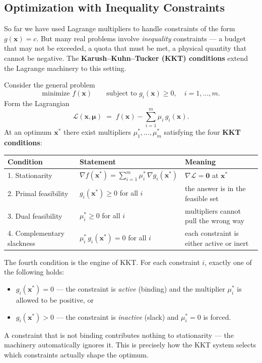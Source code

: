 \subsection*{Optimization with Inequality Constraints} 

\noindent So far we have used Lagrange multipliers to handle constraints of the form $g(\mathbf{x}) = c$. But many real problems involve \textit{inequality} constraints --- a budget that may not be exceeded, a quota that must be met, a physical quantity that cannot be negative. The \textbf{Karush--Kuhn--Tucker (KKT) conditions}  extend the Lagrange machinery to this setting.

\noindent Consider the general problem
\[
\text{minimize } f(\mathbf{x}) \qquad \text{subject to } g_i(\mathbf{x}) \geq 0, \quad i = 1, \ldots, m.
\]
Form the Lagrangian
\[
\mathcal{L}(\mathbf{x}, \boldsymbol{\mu}) \;=\; f(\mathbf{x}) - \sum_{i=1}^{m} \mu_i \, g_i(\mathbf{x}).
\]
At an optimum $\mathbf{x}^*$ there exist multipliers $\mu_1^*, \ldots, \mu_m^*$ satisfying the four \textbf{KKT conditions}:

\begin{center}
\renewcommand{\arraystretch}{1.5}
\begin{tabular}{@{}p{}p{}p{}@{}}
\toprule
\textbf{Condition} & \textbf{Statement} & \textbf{Meaning} \\
\midrule
1. Stationarity & $\nabla f(\mathbf{x}^*) = \displaystyle\sum_{i=1}^{m} \mu_i^* \, \nabla g_i(\mathbf{x}^*)$ & $\nabla \mathcal{L} = \mathbf{0}$ at $\mathbf{x}^*$ \\
2. Primal feasibility & $g_i(\mathbf{x}^*) \geq 0$ for all $i$ & the answer is in the feasible set \\
3. Dual feasibility & $\mu_i^* \geq 0$ for all $i$ & multipliers cannot pull the wrong way \\
4. Complementary slackness & $\mu_i^* \, g_i(\mathbf{x}^*) = 0$ for all $i$ & each constraint is either active or inert \\
\bottomrule
\end{tabular}
\end{center}

\noindent The fourth condition is the engine of KKT. For each constraint $i$, exactly one of the following holds:
\begin{itemize}\setlength{\itemsep}{2pt}
  \item $g_i(\mathbf{x}^*) = 0$ \;---\; the constraint is \emph{active} (binding) and the multiplier $\mu_i^*$ is allowed to be positive, or
  \item $g_i(\mathbf{x}^*) > 0$ \;---\; the constraint is \emph{inactive} (slack) and $\mu_i^* = 0$ is forced.
\end{itemize}
A constraint that is not binding contributes nothing to stationarity --- the machinery automatically ignores it. This is precisely how the KKT system selects which constraints actually shape the optimum.

